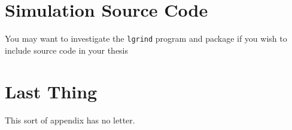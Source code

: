 \documentclass[a4paper,11pt,phdthesis,singlespace,twoside]{cssethesis}
\begin{document}
\chapter{Simulation Source Code}
You may want to investigate the \texttt{lgrind} program and package if you
wish to include source code in your thesis


\backmatter						%



\chapter{Last Thing} 
This sort of appendix has no letter. 
\end{document}
